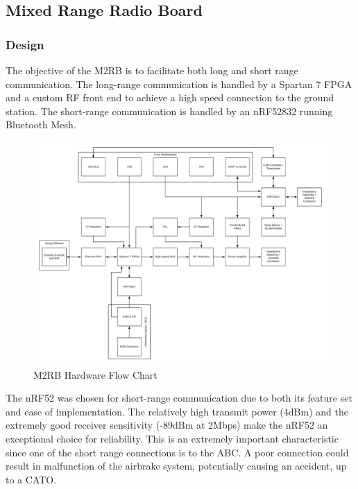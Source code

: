 \documentclass[crop=false]{standalone}
\begin{document}
    

    \newpage
    \newpage
        
    \clearpage
\subsection{Mixed Range Radio Board}
    \subsubsection{Design}
        The objective of the M2RB is to facilitate both long and short range communication. The long-range communication is handled by a Spartan 7 FPGA and a custom RF front end to achieve a high speed connection to the ground station. The short-range communication is handled by an nRF52832 running Bluetooth Mesh.
        \begin{figure}[H]
            \centering
            \includegraphics[width=\textwidth]{M2RB Hardware Diagram.PNG}
            \caption{M2RB Hardware Flow Chart}
            \label{fig:M2RBHardwareDesign}
        \end{figure}
            
        The nRF52 was chosen for short-range communication due to both its feature set and ease of implementation. The relatively high transmit power (4dBm) and the extremely good receiver sensitivity (-89dBm at 2Mbps) make the nRF52 an exceptional choice for reliability. This is an extremely important characteristic since one of the short range connections is to the ABC. A poor connection could result in malfunction of the airbrake system, potentially causing an accident, up to a CATO.
            
\end{document}
